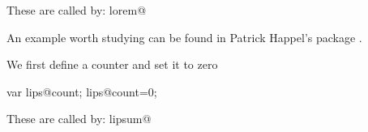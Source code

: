 \topline
\begin{teXXX}

These are called by:
 \csname lorem@\endcsname%
\end{teXXX}
\bottomline

An example worth studying can be found in Patrick Happel's package .

We first define a counter and set it to zero


\begin{teX}
\setcounter{lips@count}{0}

var lips@count;
      lips@count=0;
\end{teX}



\begin{teXXX}
\newcommand\lips@default{1-7}

\newcommand\setlipsumdefault[1]{%
  \renewcommand{\lips@default}{#1}}

\newcommand\lips@dolipsum{%
  \ifnum\value{lips@count}<\lips@max\relax%
    \addtocounter{lips@count}{1}%
    \csname lipsum@\roman{lips@count}\endcsname%
    \lips@dolipsum%
  \fi  
}

\newcommand\lipsum[1][\lips@default]{%
  \expandafter\lips@minmax\expandafter{#1}%
  \setcounter{lips@count}{\lips@min}%
  \addtocounter{lips@count}{-1}%
  \lips@dolipsum%
}

\def\lips@get#1-#2;{\def\lips@min{#1}\def\lips@max{#2}}
\def\lips@stripmax#1-{\edef\lips@max{#1}}
\def\lips@minmax#1{%
  \lips@get#1-\relax;%
  \edef\lips@tmpa{\lips@max}%
  \edef\lips@relax{\relax}%
  \ifx\lips@tmpa\lips@relax\edef\lips@max{\lips@min}%
  \else\expandafter\lips@stripmax\lips@max\fi%
}

\newcommand\lipsum@i{Lorem ipsum dolor sit amet, consectetuer
  adipiscing elit. Ut purus elit, vestibulum ut, placerat ac,
  adipiscing vitae, felis.. \par}

These are called by:
 \csname lipsum@\endcsname%

\end{teXXX}



